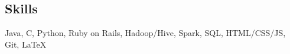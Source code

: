 \documentclass[10pt,margin,line]{resume}
\begin{document}
\begin{resume}
\section{\mysidestyle Skills}
    Java, C, Python, Ruby on Rails, Hadoop/Hive, Spark, SQL, HTML/CSS/JS, Git, \LaTeX\\

\end{resume}
\end{document}
